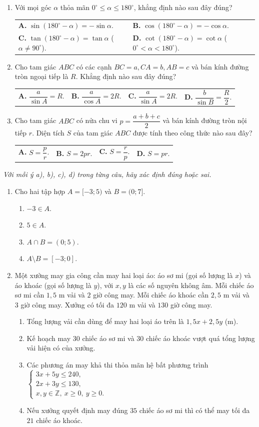 \documentclass[12pt,a4paper]{article}
\makeatletter
\newcommand{\parttitle}[1]{\par\vspace{3pt}{\large\bfseries\color{ink}#1}\par\vspace{2pt}}
\newcommand{\four}[4]{\par\noindent\begin{tabularx}{\linewidth}{@{}*{4}{>{\raggedright\arraybackslash}X}@{}}\textbf{A.} #1&\textbf{B.} #2&\textbf{C.} #3&\textbf{D.} #4\end{tabularx}}
\newcommand{\two}[4]{\par\noindent\begin{tabularx}{\linewidth}{@{}*{2}{>{\raggedright\arraybackslash}X}@{}}\textbf{A.} #1&\textbf{B.} #2\\[3pt]\textbf{C.} #3&\textbf{D.} #4\end{tabularx}}
\makeatother
\begin{document}
\begin{enumerate}
\four{$\sin\alpha > 0$.}{$\cos\alpha < 0$.}{$\tan\alpha < 0$.}{$\cot\alpha < 0$.}
\item Với mọi góc $\alpha$ thỏa mãn $0^\circ \leq \alpha \leq 180^\circ$, khẳng định nào sau đây đúng?
\two{$\sin(180^\circ - \alpha) = -\sin\alpha$.}{$\cos(180^\circ - \alpha) = -\cos\alpha$.}{$\tan(180^\circ - \alpha) = \tan\alpha$ ($\alpha \neq 90^\circ$).}{$\cot(180^\circ - \alpha) = \cot\alpha$ ($0^\circ < \alpha < 180^\circ$).}
\item Cho tam giác $ABC$ có các cạnh $BC = a, CA = b, AB = c$ và bán kính đường tròn ngoại tiếp là $R$. Khẳng định nào sau đây đúng?
\four{$\dfrac{a}{\sin A} = R$.}{$\dfrac{a}{\cos A} = 2R$.}{$\dfrac{a}{\sin A} = 2R$.}{$\dfrac{b}{\sin B} = \dfrac{R}{2}$.}
\item Cho tam giác $ABC$ có nửa chu vi $p = \dfrac{a+b+c}{2}$ và bán kính đường tròn nội tiếp $r$. Diện tích $S$ của tam giác $ABC$ được tính theo công thức nào sau đây?
\four{$S = \dfrac{p}{r}$.}{$S = 2pr$.}{$S = \dfrac{r}{p}$.}{$S = pr$.}
\end{enumerate}

\par\vspace{8pt}
\parttitle{PHẦN II. Trắc nghiệm đúng/sai}
\textit{Với mỗi ý a), b), c), d) trong từng câu, hãy xác định đúng hoặc sai.}
\begin{enumerate}
\item Cho hai tập hợp $A = [-3; 5)$ và $B = (0; 7]$.
\begin{enumerate}
\item $-3 \in A$.
\item $5 \in A$.
\item $A \cap B = (0; 5)$.
\item $A \setminus B = [-3; 0]$.
\end{enumerate}
\item Một xưởng may gia công cần may hai loại áo: áo sơ mi (gọi số lượng là $x$) và áo khoác (gọi số lượng là $y$), với $x, y$ là các số nguyên không âm. Mỗi chiếc áo sơ mi cần $1{,}5$ m vải và $2$ giờ công may. Mỗi chiếc áo khoác cần $2{,}5$ m vải và $3$ giờ công may. Xưởng có tối đa $120$ m vải và $130$ giờ công may.
\begin{enumerate}
\item Tổng lượng vải cần dùng để may hai loại áo trên là $1{,}5x + 2{,}5y$ (m).
\item Kế hoạch may $30$ chiếc áo sơ mi và $30$ chiếc áo khoác vượt quá tổng lượng vải hiện có của xưởng.
\item Các phương án may khả thi thỏa mãn hệ bất phương trình
$\begin{cases} 3x + 5y \leq 240, \\ 2x + 3y \leq 130, \\ x, y \in \mathbb{Z},\ x \geq 0,\ y \geq 0. \end{cases}$
\item Nếu xưởng quyết định may đúng $35$ chiếc áo sơ mi thì có thể may tối đa $21$ chiếc áo khoác.
\end{enumerate}
\end{enumerate}
\end{document}
